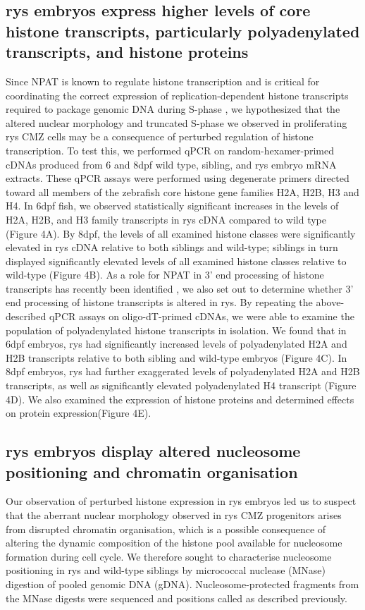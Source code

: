 \subsection{rys embryos express higher levels of core histone transcripts, particularly polyadenylated transcripts, and histone proteins}
Since NPAT is known to regulate histone transcription and is critical for coordinating the correct expression of replication-dependent histone transcripts required to package genomic DNA during S-phase \cite{Zhao2000}, we hypothesized that the altered nuclear morphology and truncated S-phase we observed in proliferating rys CMZ cells may be a consequence of perturbed regulation of histone transcription. To test this, we performed qPCR on random-hexamer-primed cDNAs produced from 6 and 8dpf wild type, sibling, and rys embryo mRNA extracts. These qPCR assays were performed using degenerate primers directed toward all members of the zebrafish core histone gene families H2A, H2B, H3 and H4. In 6dpf fish, we observed statistically significant increases in the levels of H2A, H2B, and H3 family transcripts in rys cDNA compared to wild type (Figure 4A). By 8dpf, the levels of all examined histone classes were significantly elevated in rys cDNA relative to both siblings and wild-type; siblings in turn displayed significantly elevated levels of all examined histone classes relative to wild-type (Figure 4B). As a role for NPAT in 3’ end processing of histone transcripts has recently been identified \cite{Pirngruber2010}, we also set out to determine whether 3’ end processing of histone transcripts is altered in rys. By repeating the above-described qPCR assays on oligo-dT-primed cDNAs, we were able to examine the population of polyadenylated histone transcripts in isolation. We found that in 6dpf embryos, rys had significantly increased levels of polyadenylated H2A and H2B transcripts relative to both sibling and wild-type embryos (Figure 4C). In 8dpf embryos, rys had further exaggerated levels of polyadenylated H2A and H2B transcripts, as well as significantly elevated polyadenylated H4 transcript (Figure 4D). We also examined the expression of histone proteins and determined effects on protein expression(Figure 4E).
\subsection{rys embryos display altered nucleosome positioning and chromatin organisation}
 Our observation of perturbed histone expression in rys embryos led us to suspect that the aberrant nuclear morphology observed in rys CMZ progenitors arises from disrupted chromatin organisation, which is a possible consequence of altering the dynamic composition of the histone pool available for nucleosome formation during cell cycle. We therefore sought to characterise nucleosome positioning in rys and wild-type siblings by micrococcal nuclease (MNase) digestion of pooled genomic DNA (gDNA). Nucleosome-protected fragments from the MNase digests were sequenced and positions called as described previously.

